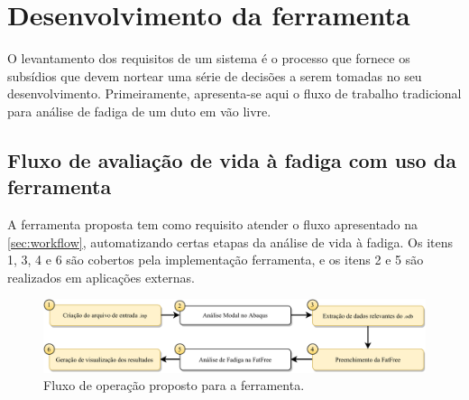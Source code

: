 \chapter{Desenvolvimento da ferramenta}\label{chap:software}


O levantamento dos requisitos de um sistema é o processo que fornece os subsídios que devem nortear uma série de decisões a serem tomadas no seu desenvolvimento. Primeiramente, apresenta-se aqui o fluxo de trabalho tradicional para análise de fadiga de um duto em vão livre. %




\section{Fluxo de avaliação de vida à fadiga com uso da ferramenta} %


A ferramenta proposta tem como requisito atender o fluxo apresentado na \autoref{sec:workflow}, automatizando certas etapas da análise de vida à fadiga. Os itens 1, 3, 4 e 6 são cobertos pela implementação ferramenta, e os itens 2 e 5 são realizados em aplicações externas.


\begin{figure}[!ht]
    \centering
    \caption{Fluxo de operação proposto para a ferramenta.}\label{fig:workflow}
    \includegraphics[width=\textwidth]{imagens/fluxograma_automatizado}
\end{figure}

